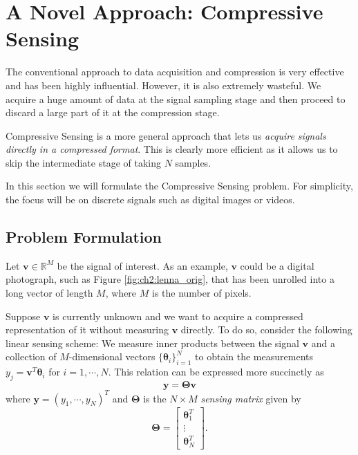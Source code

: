 \section{A Novel Approach: Compressive Sensing}
The conventional approach to data acquisition and compression is very effective and has been highly influential.
However, it is also extremely wasteful.
We acquire a huge amount of data at the signal sampling stage and then proceed to discard a large part of it at the compression stage.

Compressive Sensing is a more general approach that lets us \emph{acquire signals directly in a compressed format}.
This is clearly more efficient as it allows us to skip the intermediate stage of taking $N$ samples.

In this section we will formulate the Compressive Sensing problem.
For simplicity, the focus will be on discrete signals such as digital images or videos.

\subsection{Problem Formulation}
Let $\bm v \in\mathbb{R}^M$ be the signal of interest.
As an example, $\bm v$ could be a digital photograph, such as Figure \ref{fig:ch2:lenna_orig}, that has been unrolled into a long vector of length $M$, where $M$ is the number of pixels.

Suppose $\bm v$ is currently unknown and we want to acquire a compressed representation of it without measuring $\bm v$ directly.
To do so, consider the following linear sensing scheme:
We measure inner products between the signal $\bm v$ and a collection of $M$-dimensional vectors $\{\bm\theta_i\}_{i=1}^N$ to obtain the measurements $y_j = \bm v^T\bm\theta_i$ for $i = 1,\cdots,N$. 
This relation can be expressed more succinctly as%
\begin{equation}
\label{eqn:cs_sensing}
  \bm y = \bm\Theta\bm v
\end{equation}
where $\bm y = (y_1,\cdots,y_N)^T$ and $\bm\Theta$ is the $N\times M$ \emph{sensing matrix} given by
\begin{equation}
\label{eqn:ch2:sensor2}
  \bm\Theta = 
  \begin{bmatrix} 
    \bm \theta_1^T\\
    \vdots\\
    \bm \theta_N^T
  \end{bmatrix}.
\end{equation}

